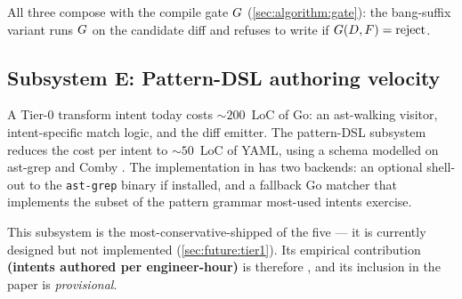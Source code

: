 All three compose with the compile gate $G$
(\cref{sec:algorithm:gate}): the bang-suffix variant runs $G$ on
the candidate diff and refuses to write if $G(D, F) =
\text{reject}$.

\subsection{Subsystem E: Pattern-DSL authoring velocity}
\label{sec:system:patterndsl}

A Tier-0 transform intent today costs $\sim 200$~LoC of Go: an
ast-walking visitor, intent-specific match logic, and the diff
emitter. The pattern-DSL subsystem reduces the cost per intent to
$\sim 50$~LoC of YAML, using a schema modelled on ast-grep
\cite{ast_grep} and Comby \cite{comby}. The implementation in
\blackrim has two backends: an optional shell-out to the
\texttt{ast-grep} binary if installed, and a fallback Go matcher that
implements the subset of the pattern grammar most-used intents
exercise.

This subsystem is the most-conservative-shipped of the five
--- it is currently designed but not implemented
(\cref{sec:future:tier1}). Its empirical contribution
\textbf{(intents authored per engineer-hour)} is therefore
, and its inclusion in the paper is
\emph{provisional}.
